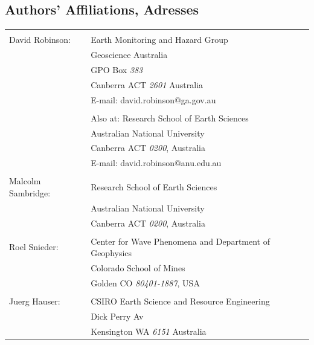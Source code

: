 \documentclass[12pt,double]{article}
\begin{document}
\vspace{2em}
\begin{centering}
\section*{Authors' Affiliations, Adresses}
\end{centering}

\begin{tabular}{lp{}}
 & \\
David Robinson: & Earth Monitoring and Hazard Group \\
 &  Geoscience Australia \\
 & GPO Box \emph{383} \\
 & Canberra ACT \emph{2601} Australia \\
 & E-mail: david.robinson@ga.gov.au\\
 & \\
 & Also at: Research School of Earth Sciences \\
 & Australian National University \\ 
 & Canberra ACT \emph{0200}, Australia \\
 & E-mail: david.robinson@anu.edu.au \\
 & \\
 Malcolm Sambridge: & Research School of Earth Sciences \\
 & Australian National University \\ 
 & Canberra ACT \emph{0200}, Australia \\
  & \\
Roel Snieder: & Center for Wave Phenomena and Department of Geophysics \\
 & Colorado School of Mines \\
 & Golden CO \emph{80401-1887}, USA \\
 & \\
Juerg Hauser: & CSIRO Earth Science and Resource Engineering \\
 & Dick Perry Av \\
 & Kensington WA \emph{6151} Australia
\end{tabular}

\clearpage

\end{document}
